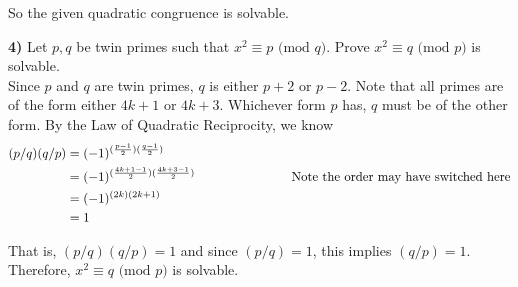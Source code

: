 \documentclass{scrartcl}
\renewcommand{\mod}[1]{\text{ (mod $#1$)}}
\begin{document}
So the given quadratic congruence is solvable.\pagebreak

\textbf{4)} Let $p,q$ be twin primes such that $x^2\equiv p\mod{q}$.  Prove $x^2\equiv q\mod{p}$ is solvable.\\

Since $p$ and $q$ are twin primes, $q$ is either $p + 2$ or $p - 2$. Note that all primes are of the form either $4k+1$ or $4k+3$. Whichever form $p$ has, $q$ must be of the other form. By the Law of Quadratic Reciprocity, we know
\begin{align*}
  (p/q)(q/p) &= (-1)^{(\frac{p-1}{2})(\frac{q-1}{2})}\\
  &= (-1)^{(\frac{4k+1-1}{2})(\frac{4k+3-1}{2})} \text{\hspace{1in} Note the order may have switched here}\\
  &= (-1)^{(2k)(2k+1)}\\
  &= 1
\end{align*}

That is, $(p/q)(q/p) = 1$ and since $(p/q) = 1$, this implies $(q/p)=1$. Therefore, $x^2\equiv q\mod{p}$ is solvable.
\end{document}
